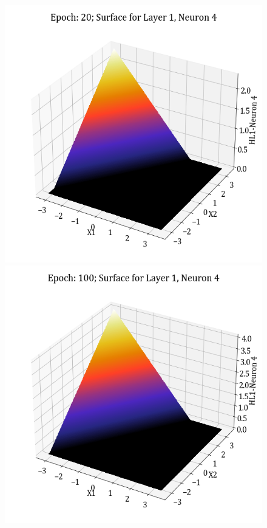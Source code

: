 \documentclass[11pt,a4paper]{article}
\begin{document}
\begin{figure}[H]
    \includegraphics[scale=0.4]{images/1B_MLFFNN_E20_HL1_N4.png}
    \includegraphics[scale=0.4]{images/1B_MLFFNN_E100_HL1_N4.png}

\end{figure}
\end{document}
